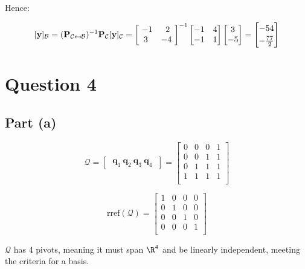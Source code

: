 \documentclass{article}
\begin{document}
Hence:

\[%
    [\mathbf{y}]_{\mathcal{B}}
    =
    (\mathbf{P}_{\mathcal{C\mapsfrom B}})^{-1}
    \mathbf{P}_{\mathcal{C}}
    [\mathbf{y}]_{\mathcal{C}}
    =
    \begin{bmatrix} \ -1 & 2\\ 3 & -4 \ \end{bmatrix}^{-1}
    \begin{bmatrix} -1 & 4 \\ -1 & 1 \\\end{bmatrix}
    \begin{bmatrix} 3 \\ -5 \end{bmatrix}
    =
    \begin{bmatrix} -54 \vspace{1mm}\\  -\frac{77}{2}  \end{bmatrix}
\]%

\clearpage
\section{Question 4} 
\subsection{Part (a)} 

\[%
    \mathcal{Q}
    =
    \begin{bmatrix} \
        \mathbf{q}_{1} \
        \mathbf{q}_{2} \
        \mathbf{q}_{3} \ 
        \mathbf{q}_{4} \
    \end{bmatrix}
    =
    \begin{bmatrix} 
        0 & 0 & 0 & 1 \\
		0 & 0 & 1 & 1 \\
		0 & 1 & 1 & 1 \\
		1 & 1 & 1 & 1 \\		
    \end{bmatrix}
\]%


\[%
    \text{rref} (\mathcal{Q}) 
    =
    \begin{bmatrix} 
        1 & 0 & 0 & 0 \\
		0 & 1 & 0 & 0 \\
		0 & 0 & 1 & 0 \\
		0 & 0 & 0 & 1 \\		
    \end{bmatrix}
\]%

$ \mathcal{Q} $ has 4 pivots, meaning it must span $ \R^{4} $ and be linearly
independent, meeting the criteria for a basis.
\end{document}
